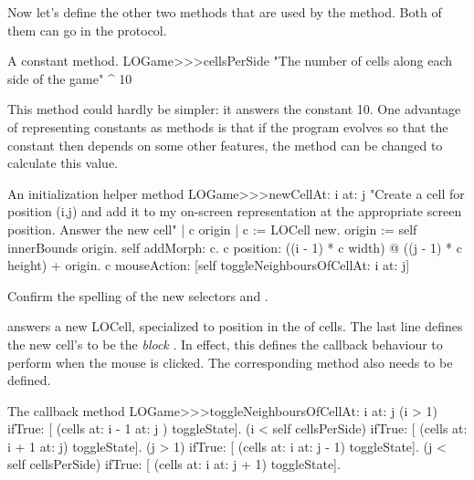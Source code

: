 \documentclass[a4paper,10pt,twoside]{book}
\begin{document}
{Now let's define the other two methods that are used by the  method. Both of them can go in the  protocol.

\begin{method}[sbegamecellsperside]{A constant method.}
LOGame>>>cellsPerSide
   "The number of cells along each side of the game"
   ^ 10
\end{method}

This method could hardly be simpler: it answers the constant 10.  One advantage of representing constants as methods is that if the program evolves so that the constant then depends on some other features, the method can be changed to calculate this value.

\begin{method}[newCellAt:at:]{An initialization helper method}
LOGame>>>newCellAt: i at: j
   "Create a cell for position (i,j) and add it to my on-screen
   representation at the appropriate screen position.  Answer the new cell"
   | c origin |
   c := LOCell new.
   origin := self innerBounds origin.
   self addMorph: c.
   c position: ((i - 1) * c width) @ ((j - 1) * c height) + origin.
   c mouseAction: [self toggleNeighboursOfCellAt: i at: j]
\end{method}

Confirm the spelling of the new selectors  and .

 answers a new LOCell, specialized to position  in the  of cells.
The last line defines the new cell's  to be the \emph{block}
\mbox{.}
 In effect, this defines the callback behaviour to perform when the mouse is clicked.
The corresponding method also needs to be defined.

\begin{method}[toggleNeighboursOfCellAt:at:]{The callback method}
LOGame>>>toggleNeighboursOfCellAt: i at: j
   (i > 1) ifTrue: [ (cells at: i - 1 at: j ) toggleState].
   (i < self cellsPerSide) ifTrue: [ (cells at: i + 1 at: j) toggleState].
   (j > 1) ifTrue: [ (cells at: i  at: j - 1) toggleState].
   (j < self cellsPerSide) ifTrue: [ (cells at: i at: j + 1) toggleState].
\end{method}

}
\end{document}
